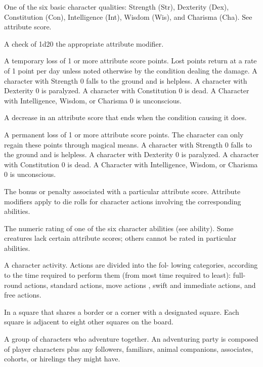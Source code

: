  One of the six basic character qualities: Strength (Str), 
Dexterity (Dex), Constitution (Con), Intelligence (Int), Wisdom 
(Wis), and Charisma (Cha). See attribute score. 

 A check of 1d20 \add the appropriate attribute modifier. 

 A temporary loss of 1 or more attribute score 
points. Lost points return at a rate of 1 point per day unless noted 
otherwise by the condition dealing the damage. A character with 
Strength 0 falls to the ground and is helpless. A character with 
Dexterity 0 is paralyzed. A character with Constitution 0 is dead. A 
Character with Intelligence, Wisdom, or Charisma 0 is unconscious. 

 A decrease in an attribute score that ends when 
the condition causing it does. 

 A permanent loss of 1 or more attribute score points. 
The character can only regain these points through magical means. 
A character with Strength 0 falls to the ground and is helpless. A 
character with Dexterity 0 is paralyzed. A character with 
Constitution 0 is dead. A Character with Intelligence, Wisdom, or 
Charisma 0 is unconscious. 

 The bonus or penalty associated with a particular attribute score. Attribute modifiers apply to die rolls for character 
actions involving the corresponding abilities. 

 The numeric rating of one of the six character 
abilities (see ability). Some creatures lack certain attribute scores; 
others cannot be rated in particular abilities. 

 A character activity. Actions are divided into the fol-
lowing categories, according to the time required to perform them 
(from most time required to least): full-round actions, standard 
actions, move actions , swift and immediate actions, and free actions. 

 In a square that shares a border or a corner with a 
designated square. Each square is adjacent to eight other squares on 
the board. 

 A group of characters who adventure 
together. An adventuring party is composed of player characters 
plus any followers, familiars, animal companions, associates, cohorts, or hirelings they might have. 

